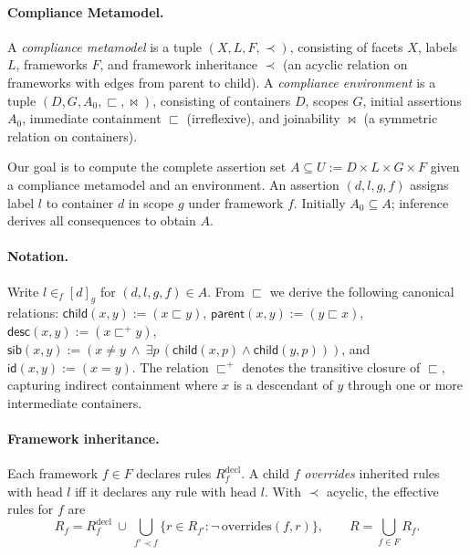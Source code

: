 \documentclass{IOS-Book-Article}
\begin{document}
\paragraph{Compliance Metamodel.}
A \emph{compliance metamodel} is a tuple $(X,L,F,\prec)$, consisting of facets $X$, labels $L$, frameworks $F$, and framework inheritance $\prec$ (an acyclic relation on frameworks with edges from parent to child). A \emph{compliance environment} is a tuple $(D,G,A_0,\sqsubset,\bowtie)$, consisting of containers $D$, scopes $G$, initial assertions $A_0$, immediate containment $\sqsubset$ (irreflexive), and joinability $\bowtie$ (a symmetric relation on containers).

Our goal is to compute the complete assertion set $A\subseteq U:=D\times L\times G\times F$ given a compliance metamodel and an environment. An assertion $(d,l,g,f)$ assigns label $l$ to container $d$ in scope $g$ under framework $f$. Initially $A_0\subseteq A$; inference derives all consequences to obtain $A$.

\paragraph{Notation.} Write $l\in_f[d]_g$ for $(d,l,g,f)\in A$. From $\sqsubset$ we derive the following canonical relations: $\textsf{child}(x,y) := (x\sqsubset y)$, $\textsf{parent}(x,y) := (y\sqsubset x)$, $\textsf{desc}(x,y) := (x\sqsubset^+ y)$, $\textsf{sib}(x,y) := (x\!\ne\! y\ \wedge\ \exists p\,(\textsf{child}(x,p)\wedge \textsf{child}(y,p)))$, and $\textsf{id}(x,y) := (x=y)$. The relation $\sqsubset^+$ denotes the transitive closure of $\sqsubset$, capturing indirect containment where $x$ is a descendant of $y$ through one or more intermediate containers.

\paragraph{Framework inheritance.}
Each framework $f\in F$ declares rules $R_f^{\mathrm{decl}}$. A child $f$ \emph{overrides} inherited rules with head $l$ iff it declares any rule with head $l$. With $\prec$ acyclic, the effective rules for $f$ are
\[
R_f = R_f^{\mathrm{decl}}\ \cup\ \bigcup_{f'\prec f}\{r\in R_{f'}:\neg\,\mathrm{overrides}(f,r)\},\qquad
R=\bigcup_{f\in F}R_f.
\]
\end{document}
